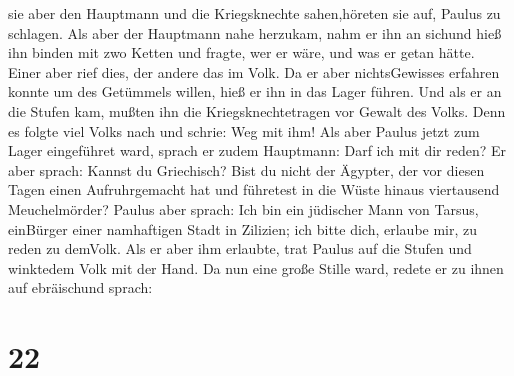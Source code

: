 sie aber den Hauptmann und die Kriegsknechte sahen,höreten sie auf,
Paulus zu schlagen.  Als aber der Hauptmann nahe herzukam,
nahm er ihn an sichund hieß ihn binden mit zwo Ketten und fragte, wer er
wäre, und was er getan hätte.  Einer aber rief dies, der
andere das im Volk. Da er aber nichtsGewisses erfahren konnte um des
Getümmels willen, hieß er ihn in das Lager führen.  Und als
er an die Stufen kam, mußten ihn die Kriegsknechtetragen vor Gewalt des
Volks.  Denn es folgte viel Volks nach und schrie: Weg mit
ihm!  Als aber Paulus jetzt zum Lager eingeführet ward,
sprach er zudem Hauptmann: Darf ich mit dir reden? Er aber sprach:
Kannst du Griechisch?  Bist du nicht der Ägypter, der vor
diesen Tagen einen Aufruhrgemacht hat und führetest in die Wüste hinaus
viertausend Meuchelmörder?  Paulus aber sprach: Ich bin ein
jüdischer Mann von Tarsus, einBürger einer namhaftigen Stadt in
Zilizien; ich bitte dich, erlaube mir, zu reden zu demVolk.
 Als er aber ihm erlaubte, trat Paulus auf die Stufen und
winktedem Volk mit der Hand. Da nun eine große Stille ward, redete er zu
ihnen auf ebräischund sprach:

\hypertarget{section-21}{%
\section{22}\label{section-21}}

